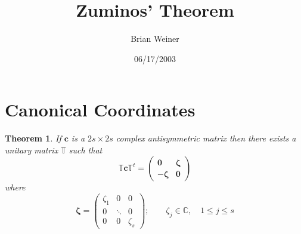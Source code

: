 \documentclass[aps,preprint]{revtex4}
\newtheorem{theorem}{Theorem}
\begin{document}
\title[Zuminos' Theorem]{Zuminos' Theorem}
\author{Brian Weiner}
\date{06/17/2003}
\maketitle
\tableofcontents

\section{Canonical Coordinates}

\begin{theorem}
If $\mathbf{c}$ is a $2s\times 2s$ complex antisymmetric matrix then there
exists a unitary matrix $\mathbb{T}$ such that 
\begin{equation}
\mathbb{T}\mathbf{c}\mathbb{T}^{t}\mathbb{=}\left( 
\begin{array}{cc}
\mathbf{0} & \mathbf{\zeta } \\ 
-\mathbf{\zeta } & \mathbf{0}%
\end{array}%
\right)
\end{equation}%
where 
\begin{equation}
\mathbf{\zeta =}\left( 
\begin{array}{ccc}
\zeta _{1} & 0 & 0 \\ 
0 & \ddots & 0 \\ 
0 & 0 & \zeta _{s}%
\end{array}%
\right) ;\qquad \zeta _{j}\in \mathbb{C},\quad 1\leq j\leq s
\end{equation}


\end{theorem}
\end{document}
